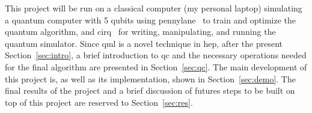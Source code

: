 This project will be run on a classical computer (my personal laptop) simulating
a quantum computer with 5 qubits using pennylane~\cite{pennylane} to train and 
optimize the quantum algorithm, and cirq~\cite{cirq} for writing, manipulating, 
and running the quantum simulator.
Since \gls{qml} is a novel technique in \gls{hep}, after the present Section~\ref{sec:intro},
a brief introduction to \gls{qc} and the necessary operations needed for the 
final algorithm are presented in Section~\ref{sec:qc}. 
The main development of this project is, as well as its implementation, shown in
Section~\ref{sec:demo}.
The final results of the project and a brief discussion of futures steps to be 
built on top of this project are reserved to Section~\ref{sec:res}.